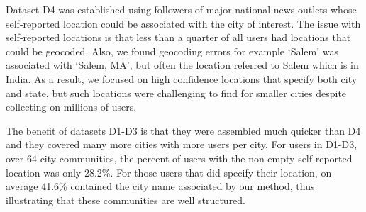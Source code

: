 Dataset D4 was established using followers of major national news outlets whose self-reported location could be associated with the city of interest. The issue with self-reported locations is that less than a quarter of all users had locations that could be geocoded. Also, we found geocoding errors for example `Salem' was associated with `Salem, MA', but often the location referred to Salem which is in India. As a result, we focused on high confidence locations that specify both city and state, but such locations were challenging to find for smaller cities despite collecting on millions of users.
 
The benefit of datasets D1-D3 is that they were assembled much quicker than D4 and they covered many more cities with more users per city. For users in D1-D3, over 64 city communities, the percent of users with the non-empty self-reported location was only 28.2\%. For those users that did specify their location, on average 41.6\% contained the city name associated by our method, thus illustrating that these communities are well structured.

